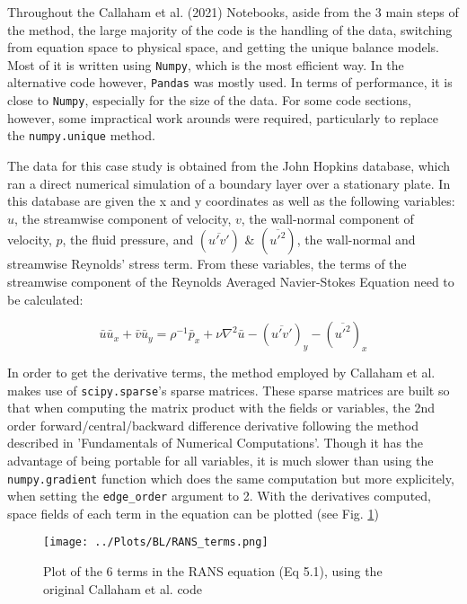 \documentclass[12pt]{report} %
\begin{document}
Throughout the Callaham et al. (2021)\cite{callaham2021learning} Notebooks, aside from the 3 main steps of the method, the large majority of the code is the handling of the data, switching from equation space to physical space, and getting the unique balance models. Most of it is written using \texttt{Numpy}, which is the most efficient way. In the alternative code however, \texttt{Pandas} was mostly used. In terms of performance, it is close to \texttt{Numpy}, especially for the size of the data. For some code sections, however, some impractical work arounds were required, particularly to replace the \texttt{numpy.unique} method.

The data for this case study is obtained from the John Hopkins database, which ran a direct numerical simulation of a boundary layer over a stationary plate\cite{jhtdb}. In this database are given the x and y coordinates as well as the following variables: $u$, the streamwise component of velocity, $v$, the wall-normal component of velocity, $p$, the fluid pressure, and $(\overline{u' v'})$ \& $(\overline{u'^2})$, the wall-normal and streamwise Reynolds' stress term. From these variables, the terms of the streamwise component of the Reynolds Averaged Navier-Stokes Equation need to be calculated:

\begin{equation}
  \bar{u} \bar{u}_x + \bar{v} \bar{u}_y = \rho^{-1} \bar{p}_x + \nu \nabla^2 \bar{u}  - (\overline{u' v'})_y - (\overline{u'^2})_x
\end{equation}

In order to get the derivative terms, the method employed by Callaham et al. makes use of \texttt{scipy.sparse}'s sparse matrices. These sparse matrices are built so that when computing the matrix product with the fields or variables, the 2nd order forward/central/backward difference derivative following the method described in 'Fundamentals of Numerical Computations'\cite{finitediff}. Though it has the advantage of being portable for all variables, it is much slower than using the \texttt{numpy.gradient} function which does the same computation but more explicitely, when setting the \texttt{edge\_order} argument to 2. With the derivatives computed, space fields of each term in the equation can be plotted (see Fig. \ref{fig:RANS_terms})

\begin{figure}
  \centering
  \texttt{[image: ../Plots/BL/RANS\_terms.png]}
  \caption{Plot of the 6 terms in the RANS equation (Eq 5.1), using the original Callaham et al. code}
  \label{fig:RANS_terms}
\end{figure}
\end{document}
